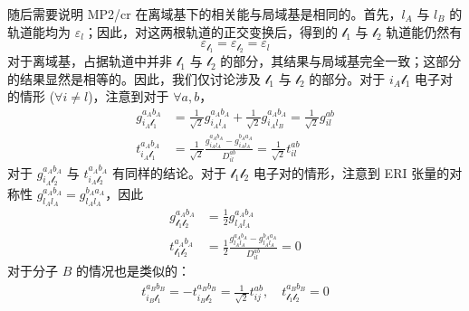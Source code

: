 随后需要说明 MP2/cr 在离域基下的相关能与局域基是相同的。首先，$l_A$ 与 $l_B$ 的轨道能均为 $\varepsilon_l$；因此，对这两根轨道的正交变换后，得到的 $\mathscr{l}_1$ 与 $\mathscr{l}_2$ 轨道能仍然有
\begin{equation*}
  \varepsilon_{\mathscr{l}_1} = \varepsilon_{\mathscr{l}_2} = \varepsilon_l
\end{equation*}
对于离域基，占据轨道中并非 $\mathscr{l}_1$ 与 $\mathscr{l}_2$ 的部分，其结果与局域基完全一致；这部分的结果显然是相等的。因此，我们仅讨论涉及 $\mathscr{l}_1$ 与 $\mathscr{l}_2$ 的部分。对于 ${i_A \mathscr{l}_1}$ 电子对的情形 ($\forall i \neq l$)，注意到对于 $\forall a, b$，
\begin{align*}
  g_{i_A \mathscr{l}_1}^{a_A b_A} &= \frac{1}{\sqrt{2}} g_{i_A l_A}^{a_A b_A} + \frac{1}{\sqrt{2}} g_{i_A l_B}^{a_A b_A} = \frac{1}{\sqrt{2}} g_{il}^{ab} \\
  t_{i_A \mathscr{l}_1}^{a_A b_A} &= \frac{1}{\sqrt{2}} \frac{g_{i_A l_A}^{a_A b_A} - g_{i_A l_A}^{b_A a_A}}{D_{il}^{ab}} = \frac{1}{\sqrt{2}} t_{il}^{ab}
\end{align*}
对于 $g_{i_A \mathscr{l}_2}^{a_A b_A}$ 与 $t_{i_A \mathscr{l}_2}^{a_A b_A}$ 有同样的结论。对于 $\mathscr{l}_1 \mathscr{l}_2$ 电子对的情形，注意到 ERI 张量的对称性 $g_{l_A l_A}^{a_A b_A} = g_{l_A l_A}^{b_A a_A}$，因此
\begin{align*}
  g_{\mathscr{l}_1 \mathscr{l}_2}^{a_A b_A} &= \frac{1}{2} g_{l_A l_A}^{a_A b_A} \\
  t_{\mathscr{l}_1 \mathscr{l}_2}^{a_A b_A} &= \frac{1}{2} \frac{g_{l_A l_A}^{a_A b_A} - g_{l_A l_A}^{b_A a_A}}{D_{il}^{ab}} = 0
\end{align*}
对于分子 $B$ 的情况也是类似的：
\begin{gather*}
  t_{i_B \mathscr{l}_1}^{a_B b_B} = - t_{i_B \mathscr{l}_2}^{a_B b_B} = \frac{1}{\sqrt{2}} t_{ij}^{ab} , \quad
  t_{\mathscr{l}_1 \mathscr{l}_2}^{a_B b_B} = 0
\end{gather*}

